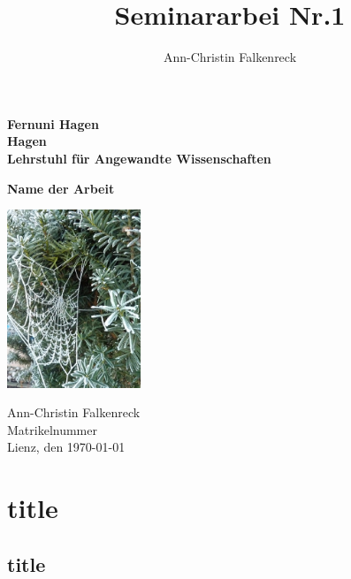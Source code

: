 \documentclass[ngerman,12pt,parskip=half]{scrreprt}
\author{Ann-Christin Falkenreck}
\title{Seminararbei Nr.1}
\begin{document}
	\begin{titlepage}
		
	{\large\textbf{Fernuni Hagen \\ Hagen \\ Lehrstuhl für Angewandte Wissenschaften}}
		
	\vspace*{4cm}
		
	{\bfseries\huge Name der Arbeit}
		
	\begin{center}
		\includegraphics[width=4cm]{Bilder/Herbst}
	\end{center}
		
	\vfill
	Ann-Christin Falkenreck\\
	Matrikelnummer \\
	Lienz, den \today
		
	\end{titlepage}
	
\tableofcontents
\listoffigures
\listoftables
	
\chapter{title}
\section{title}
\end{document}
